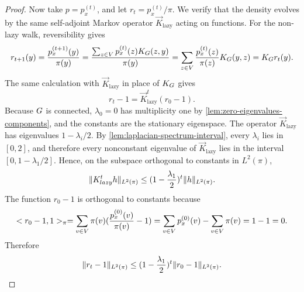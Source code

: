 \begin{proof}
	Now take \(p=p_x^{(t)}\), and let \(r_t=p_x^{(t)}/\pi\). We verify that the density evolves by the same self-adjoint Markov operator \(\vec{K}_{\mathrm{lazy}}\) acting on functions. For the non-lazy walk, reversibility gives
	\begin{equation}
		r_{t+1}(y)
		=
		\frac{p_x^{(t+1)}(y)}{\pi(y)}
		=
		\frac{\sum_{z\in V}p_x^{(t)}(z)K_{G}(z,y)}{\pi(y)}
		=
		\sum_{z\in V}\frac{p_x^{(t)}(z)}{\pi(z)}K_{G}(y,z)
		=
		K_{G} r_t(y).
	\end{equation}
	The same calculation with \(\vec{K}_{\mathrm{lazy}}\) in place of \(K_{G}\) gives
	\begin{equation}
		r_t-1=\vec{K}_{\mathrm{lazy}}^t(r_0-1).
	\end{equation}
	Because \(G\) is connected, \(\lambda_0=0\) has multiplicity one by \cref{lem:zero-eigenvalues-components}, and the constants are the stationary eigenspace. The operator \(\vec{K}_{\mathrm{lazy}}\) has eigenvalues \(1-\lambda_i/2\). By \cref{lem:laplacian-spectrum-interval}, every \(\lambda_i\) lies in \([0,2]\), and therefore every nonconstant eigenvalue of \(\vec{K}_{\mathrm{lazy}}\) lies in the interval \([0,1-\lambda_1/2]\). Hence, on the subspace orthogonal to constants in \(L^2(\pi)\),
	\begin{equation}
		\lVert K_{lazy}^t h\rVert_{L^2(\pi)}
		\leq
		(1-\frac{\lambda_1}{2})^t\lVert h\rVert_{L^2(\pi)}.
	\end{equation}
	The function \(r_0-1\) is orthogonal to constants because
	\begin{equation}
		< r_0-1,1>_{\pi}
		=
		\sum_{v\in V}\pi(v)(\frac{p_x^{(0)}(v)}{\pi(v)}-1)
		=
		\sum_{v\in V}p_x^{(0)}(v)-\sum_{v\in V}\pi(v)
		=
		1-1
		=
		0.
	\end{equation}
	Therefore
	\begin{equation}
		\lVert r_t-1\rVert_{L^2(\pi)}
		\leq
		(1-\frac{\lambda_1}{2})^t\lVert r_0-1\rVert_{L^2(\pi)}.
	\end{equation}


\end{proof}
